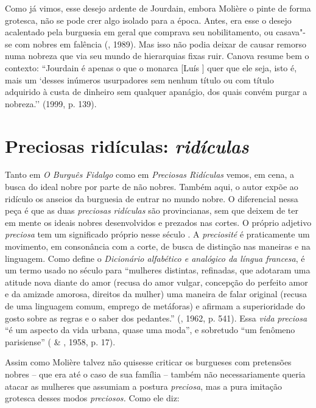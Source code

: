 Como já vimos, esse desejo ardente de Jourdain, embora Molière o pinte
de forma grotesca, não se pode crer algo isolado para a época. Antes,
era esse o desejo acalentado pela burguesia em geral que comprava seu
nobilitamento, ou casava"-se com nobres em falência (, 1989).
Mas isso não podia deixar de causar remorso numa nobreza que via seu
mundo de hierarquias fixas ruir. Canova resume bem o contexto:
``Jourdain é apenas o que o monarca [Luís ] quer que ele seja,
isto é, mais um `desses inúmeros usurpadores sem nenhum título ou com
título adquirido à custa de dinheiro sem qualquer apanágio, dos quais
convém purgar a nobreza.'' (1999, p. 139).

\section{Preciosas ridículas: \emph{ridículas}}

Tanto em \emph{O Burguês Fidalgo} como em \emph{Preciosas Ridículas}
vemos, em cena, a busca do ideal nobre por parte de não nobres. Também
aqui, o autor expõe ao ridículo os anseios da burguesia de entrar no
mundo nobre. O diferencial nessa peça é que as duas \emph{preciosas}
\emph{ridículas} são provincianas, sem que deixem de ter em mente os
ideais nobres desenvolvidos e prezados nas cortes. O próprio adjetivo
\emph{preciosa} tem um significado próprio nesse século . A
\emph{preciosité} é praticamente um movimento, em consonância com a
corte, de busca de distinção nas maneiras e na linguagem. Como define o
\emph{Dicionário alfabético e analógico da língua francesa}, é um termo
usado no século  para ``mulheres distintas, refinadas, que adotaram
uma atitude nova diante do amor (recusa do amor vulgar, concepção do
perfeito amor e da amizade amorosa, direitos da mulher) uma maneira de
falar original (recusa de uma linguagem comum, emprego de metáforas) e
afirmam a superioridade do gosto sobre as regras e o saber dos
pedantes.'' (, 1962, p. 541). Essa \emph{vida} \emph{preciosa} ``é
um aspecto da vida urbana, quase uma moda'', e sobretudo ``um fenômeno
parisiense'' ( \& , 1958, p. 17).

Assim como Molière talvez não quisesse criticar os burgueses com
pretensões nobres -- que era até o caso de sua família -- também não
necessariamente queria atacar as mulheres que assumiam a postura
\emph{preciosa}, mas a pura imitação grotesca desses modos
\emph{preciosos.} Como ele diz:


